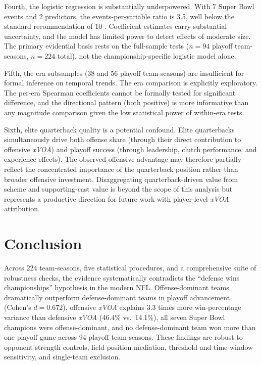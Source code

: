 \documentclass[12pt,a4paper]{article}
\newcommand{\xvoa}{\textit{xVOA}}
\begin{document}
Fourth, the logistic regression is substantially underpowered. With 7 Super Bowl events and 2 predictors, the events-per-variable ratio is 3.5, well below the standard recommendation of 10 \citep{peduzzi1996simulation, hosmer2013logistic}. Coefficient estimates carry substantial uncertainty, and the model has limited power to detect effects of moderate size. The primary evidential basis rests on the full-sample tests ($n = 94$ playoff team-seasons, $n = 224$ total), not the championship-specific logistic model alone.

Fifth, the era subsamples (38 and 56 playoff team-seasons) are insufficient for formal inference on temporal trends. The era comparison is explicitly exploratory. The per-era Spearman coefficients cannot be formally tested for significant difference, and the directional pattern (both positive) is more informative than any magnitude comparison given the low statistical power of within-era tests.

Sixth, elite quarterback quality is a potential confound. Elite quarterbacks simultaneously drive both offense share (through their direct contribution to offensive \xvoa{}) and playoff success (through leadership, clutch performance, and experience effects). The observed offensive advantage may therefore partially reflect the concentrated importance of the quarterback position rather than broader offensive investment. Disaggregating quarterback-driven value from scheme and supporting-cast value is beyond the scope of this analysis but represents a productive direction for future work with player-level \xvoa{} attribution.

\section{Conclusion}
\label{sec:conclusion}

Across 224 team-seasons, five statistical procedures, and a comprehensive suite of robustness checks, the evidence systematically contradicts the ``defense wins championships'' hypothesis in the modern NFL. Offense-dominant teams dramatically outperform defense-dominant teams in playoff advancement (Cohen's $d = 0.672$), offensive \xvoa{} explains 3.3 times more win-percentage variance than defensive \xvoa{} (46.4\% vs.\ 14.1\%), all seven Super Bowl champions were offense-dominant, and no defense-dominant team won more than one playoff game across 94 playoff team-seasons. These findings are robust to opponent-strength controls, field-position mediation, threshold and time-window sensitivity, and single-team exclusion.
\end{document}
